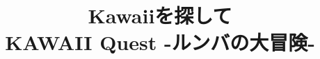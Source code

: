 \documentclass[a4paper, twocolumn]{jarticle}
\makeatletter
\def\section{\@startsection{section}{1}{\z@}%
 {.1\Cvs \@plus.1\Cdp \@minus.1\Cdp}%
 {.1\Cvs \@plus.1\Cdp}%
 {\normalfont\normalsize\bfseries}}
\makeatother
\begin{document}
\title{Kawaiiを探して\\KAWAII Quest -ルンバの大冒険-}
\date{}
\maketitle
\thispagestyle{empty}

\maketitle
%
%
\end{document}
